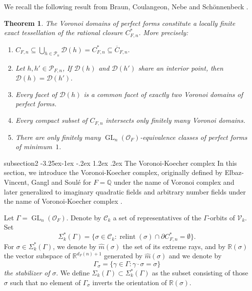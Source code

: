 \documentclass[11pt,a4paper,twoside]{amsart}
\makeatletter
\renewcommand{\subsection}{\@startsection
  {subsection}{2}{\z@}%
  {-3.25ex\@plus -1ex \@minus -.2ex}%
  {1.2ex \@plus .2ex}%
  {\normalfont\bfseries}}
\theoremstyle{plain}
\newtheorem{theorem}{\bfseries Theorem}[section]
\theoremstyle{definition}
\newcommand{\perfect}[0]{\mathcal{P}_}
\newcommand{\GLo}[0]{\operatorname{GL}_n({\mathcal{O}_F})}
\makeatother
\begin{document}
We recall the following result from Braun, Coulangeon, Nebe and Schönnenbeck \cite[Theorem~2.4, Corollary 2.5]{Coulangeon}.
\begin{theorem}
\label{vor_th}
The Voronoi domains of perfect forms constitute a locally finite
exact tessellation of the rational closure $C_{F,n}^{*}$. More
precisely:
\begin{enumerate}[label=(\roman*)]
    \item
    $
        C_{F,n}
        \subseteq
        \bigcup_{h\in\perfect n}\mathcal{D}(h)
        =
        C_{F,n}^{*}
        \subseteq
        \overline{C}_{F,n}.
    $

    \item Let $h,h'\in\perfect{F,n}$, If $\mathcal{D}(h)$ and $\mathcal{D}(h')$ share an interior point, then $\mathcal{D}(h) = \mathcal{D}(h')$.

    \item Every facet of $\mathcal{D}(h)$ is a common facet of
    exactly two Voronoi domains of perfect forms.

    \item  Every compact subset of $C_{F,n}$ intersects only finitely many Voronoi domains.

    \item There are only finitely many
    $\GLo$-equivalence classes of perfect forms of
    minimum~$1$.
\end{enumerate}
\end{theorem}


\subsection{The Voronoi-Koecher complex}
In this section, we introduce the Voronoi-Koecher complex, originally defined by Elbaz-Vincent, Gangl and Soulé \cite{2002, philippe_advances} for $F = \mathbb{Q}$ under the name of Voronoi complex and later generalized to imaginary quadratic fields \cite{hermitian} and arbitrary number fields under the name of Voronoi-Koecher complex \cite{ Vor_comp_num_fields}. 

Let $\Gamma = \GLo$. Denote by $\mathcal{C}_{k}$ a set of representatives of the $\Gamma$-orbits of $\mathcal{V}_k.$ Set
$$
\Sigma_{k}^*(\Gamma)= \{ \sigma \in \mathcal{C}_{k} : \operatorname{relint}(\sigma) \cap \partial C_{F,n}^* = \emptyset \}.
$$
For $\sigma \in \Sigma_k^*(\Gamma)$, we denote by $\widehat{m}(\sigma)$ the set of its extreme rays, and by 
$\mathbb{R}(\sigma)$ the vector subspace of $\mathbb{R}^{d_F(n)+1}$ generated by $\widehat{m}(\sigma)$ and we denote by
$$\Gamma_\sigma = \{ \gamma \in \Gamma : \gamma\cdot\sigma = \sigma \}$$
\textit{the stabilizer of $\sigma$}. We define $\Sigma_k(\Gamma) \subset \Sigma_k^*(\Gamma)$ as the subset
consisting of those $\sigma$ such that no element of $\Gamma_\sigma$ inverts the
orientation of $\mathbb{R}(\sigma)$.
\end{document}
